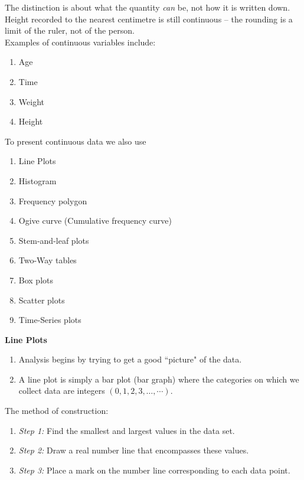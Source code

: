 \documentclass[11pt,a4paper]{article}
\theoremstyle{definition}
\begin{document}
The distinction is about what the quantity \emph{can} be, not how it is written down.
Height recorded to the nearest centimetre is still continuous -- the rounding is a limit of
the ruler, not of the person.\\[1ex]
Examples of continuous variables include:
\begin{enumerate}
\item Age
\item Time 
\item Weight
\item Height\\
\end{enumerate}



To present continuous data we also use
\begin{enumerate}
\item Line Plots
\item Histogram
\item Frequency polygon
\item Ogive curve (Cumulative frequency curve)
\item Stem-and-leaf plots
\item Two-Way tables
\item Box plots
\item Scatter plots
\item Time-Series plots\\[1ex]
\end{enumerate}



\textbf{Line Plots}
\begin{enumerate}
\item[$\bullet$] Analysis begins by trying to get a good ``picture" of the data.
\item[$\bullet$] A line plot is simply a bar plot (bar graph) where the categories on which we collect data are integers $(0,1,2,3,\ldots,\cdots)$.\\
\end{enumerate}


The method of construction:
\begin{enumerate}
\item[]\textit{Step 1:} Find the smallest and largest values in the data set.
\item[]\textit{Step 2:} Draw a real number line that encompasses these values.
\item[]\textit{Step 3:} Place a mark on the number line corresponding to each data point.\\
\end{enumerate}
\end{document}
